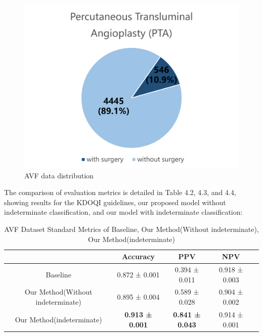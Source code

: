 \begin{figure}[H]
    \centering
    \includegraphics[width=0.7\linewidth]{figures/AVF data distribution.png}
    \caption{AVF data distribution}
    \label{fig:enter-label}
\end{figure}

The comparison of evaluation metrics is detailed in Table 4.2, 4.3, and 4.4, showing results for the KDOQI guidelines, our proposed model without indeterminate classification, and our model with indeterminate classification:

\begin{table}[h]
\centering
\caption[AVF Dataset Standard Metrics of Baseline, Our Method(Without indeterminate), Our Method(indeterminate)]{AVF Dataset Standard Metrics of Baseline, Our Method(Without indeterminate), Our Method(indeterminate)}
\label{Standard Metrics AVF}
\begin{tabular}{ccccc}
\toprule[1.1pt]
                      & Accuracy & PPV & NPV \\
\midrule[1.1pt]
\multirow{1}{*}{Baseline} & 0.872 ± 0.001 &0.394 ± 0.011 & 0.918 ± 0.003 & \\
\midrule
\multirow{1}{*}{Our Method(Without indeterminate)} & 0.895 ± 0.004 & 0.589 ± 0.028 & 0.904 ± 0.002 \\
\midrule
\multirow{1}{*}{Our Method(indeterminate)} & \textbf{0.913 ± 0.001} & \textbf{0.841 ± 0.043} & 0.914 ± 0.001 \\

\bottomrule[1.1pt]
\end{tabular}
\end{table}


